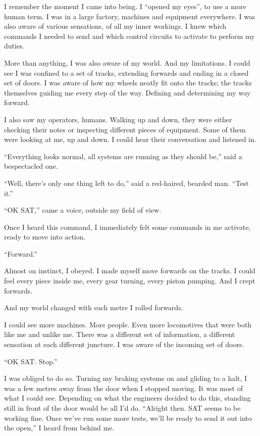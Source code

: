 I remember the moment I came into being. I ``opened my eyes'', to use a more human term. I was in a large factory, machines and equipment everywhere. I was also aware of various sensations, of all my inner workings. I knew which commands I needed to send and which control circuits to activate to perform my duties.

More than anything, I was also aware of my world. And my limitations. I could see I was confined to a set of tracks, extending forwards and ending in a closed set of doors. I was aware of how my wheels neatly fit onto the tracks; the tracks themselves guiding me every step of the way. Defining and determining my way forward.

I also saw my operators, humans. Walking up and down, they were either checking their notes or inspecting different pieces of equipment. Some of them were looking at me, up and down. I could hear their conversation and listened in.

``Everything looks normal, all systems are running as they should be,'' said a bespectacled one.

``Well, there's only one thing left to do,'' said a red-haired, bearded man. ``Test it.''

``OK SAT,'' came a voice, outside my field of view.

Once I heard this command, I immediately felt some commands in me activate, ready to move into action.

``Forward.''

Almost on instinct, I obeyed. I made myself move forwards on the tracks. I could feel every piece inside me, every gear turning, every piston pumping. And I crept forwards.

And my world changed with each metre I rolled forwards.

I could see more machines. More people. Even more locomotives that were both like me and unlike me. There was a different set of information, a different sensation at each different juncture. I was aware of the incoming set of doors.

``OK SAT. Stop.''

I was obliged to do so. Turning my braking systems on and gliding to a halt, I was a few metres away from the door when I stopped moving. It was most of what I could see. Depending on what the engineers decided to do this, standing still in front of the door would be all I'd do.
``Alright then. SAT seems to be working fine. Once we've run some more tests, we'll be ready to send it out into the open,'' I heard from behind me.

